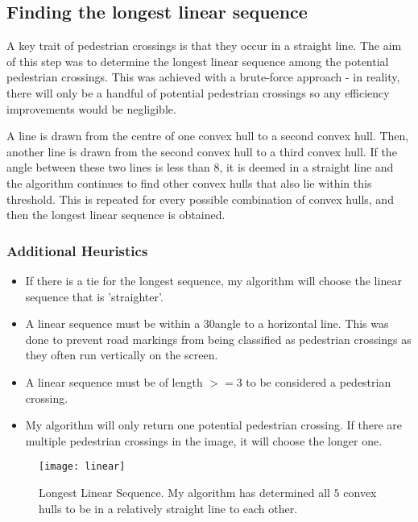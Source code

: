 \documentclass{article}  %
\begin{document}
	\subsection{Finding the longest linear sequence}
	
	A key trait of pedestrian crossings is that they occur in a straight line. The aim of this step was to determine the longest linear sequence among the potential pedestrian crossings. This was achieved with a brute-force approach - in reality, there will only be a handful of potential pedestrian crossings so any efficiency improvements would be negligible.
	
	A line is drawn from the centre of one convex hull to a second convex hull. Then, another line is drawn from the second convex hull to a third convex hull. If the angle between these two lines is less than $8$\textdegree, it is deemed in a straight line and the algorithm continues to find other convex hulls that also lie within this threshold. This is repeated for every possible combination of convex hulls, and then the longest linear sequence is obtained.
	
	\subsubsection*{Additional Heuristics}
	
	\begin{itemize}
		\item If there is a tie for the longest sequence, my algorithm will choose the linear sequence that is 'straighter'.
		\item A linear sequence must be within a $30$\textdegree angle to a horizontal line. This was done to prevent road markings from being classified as pedestrian crossings as they often run vertically on the screen.
		\item A linear sequence must be of length $>= 3$ to be considered a pedestrian crossing.
		\item My algorithm will only return one potential pedestrian crossing. If there are multiple pedestrian crossings in the image, it will choose the longer one.
	\end{itemize}
	
	\begin{figure}[H]
		\centering
		\texttt{[image: linear]}
		\caption{Longest Linear Sequence. My algorithm has determined all $5$ convex hulls to be in a relatively straight line to each other.}
	\end{figure}
	
\end{document}
